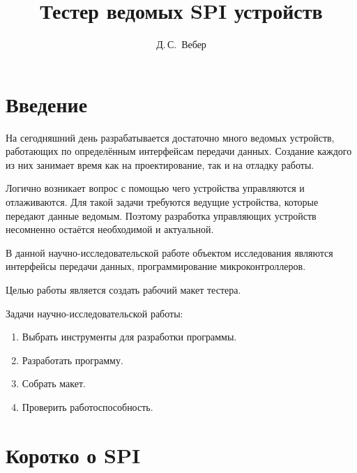 \documentclass[14pt, oneside]{altsu-report}
\title{Тестер ведомых SPI устройств}
\author{Д.\,С.~Вебер}
\institute{Институт цифровых технологий, электроники и физики}
\date{\the\year}
\begin{document}
\maketitle
\setcounter{page}{2}
\makeabstract
\tableofcontents

\chapter*{Введение}
	На сегодняшний день разрабатывается достаточно много ведомых устройств, работающих по определённым интерфейсам передачи данных. Создание каждого из них занимает время как на проектирование, так и на отладку работы.
	
	Логично возникает вопрос с помощью чего устройства управляются и отлаживаются. Для такой задачи требуются ведущие устройства, которые передают данные ведомым. Поэтому разработка управляющих устройств несомненно остаётся необходимой и актуальной.
	
	В данной научно-исследовательской работе объектом исследования являются интерфейсы передачи данных, программирование микроконтроллеров. 
	
	Целью работы является создать рабочий макет тестера.
	
	Задачи научно-исследовательской работы:  
	\begin{enumerate}
		\item Выбрать инструменты для разработки программы.
		\item Разработать программу.
		\item Собрать макет.
		\item Проверить работоспособность.
	\end{enumerate}

\chapter{Коротко о SPI} 
\end{document}
